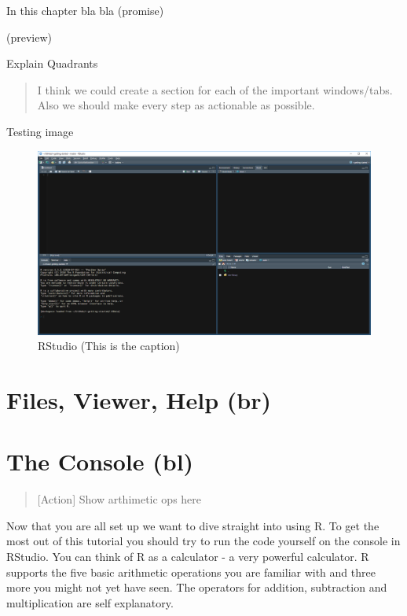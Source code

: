 \documentclass[]{book}
\theoremstyle{definition}
\theoremstyle{definition}
\theoremstyle{definition}
\theoremstyle{remark}
\begin{document}
In this chapter bla bla (promise)

(preview)

Explain Quadrants

\begin{quote}
I think we could create a section for each of the important
windows/tabs. Also we should make every step as actionable as possible.
\end{quote}

Testing image

\begin{figure}
\includegraphics[width=1\linewidth]{static/images/RStudio} \caption{RStudio (This is the caption)}\label{fig:rstudio-view}
\end{figure}

\section{Files, Viewer, Help (br)}\label{files-viewer-help-br}

\section{The Console (bl)}\label{the-console-bl}

\begin{quote}
{[}Action{]} Show arthimetic ops here
\end{quote}

Now that you are all set up we want to dive straight into using R. To
get the most out of this tutorial you should try to run the code
yourself on the console in RStudio. You can think of R as a calculator -
a very powerful calculator. R supports the five basic arithmetic
operations you are familiar with and three more you might not yet have
seen. The operators for addition, subtraction and multiplication are
self explanatory.
\end{document}
